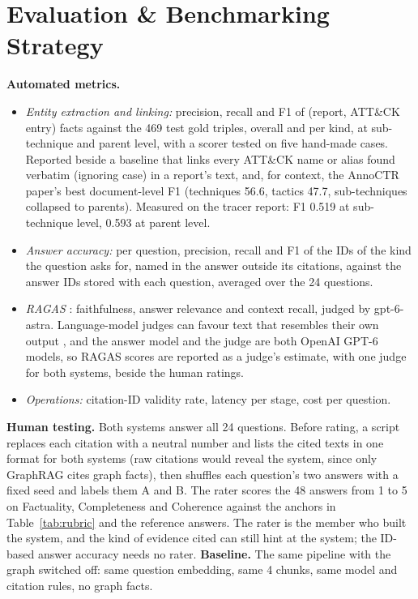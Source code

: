 \documentclass[10pt]{article}
\begin{document}
\section{Evaluation \& Benchmarking Strategy}\label{sec:eval}
\textbf{Automated metrics.}
\begin{itemize}
\item \emph{Entity extraction and linking:} precision, recall and F1 of (report, ATT\&CK entry) facts against the 469 test gold triples, overall and per kind, at sub-technique and parent level, with a scorer tested on five hand-made cases. Reported beside a baseline that links every ATT\&CK name or alias found verbatim (ignoring case) in a report's text, and, for context, the AnnoCTR paper's best document-level F1 (techniques 56.6, tactics 47.7, sub-techniques collapsed to parents). Measured on the tracer report: F1 0.519 at sub-technique level, 0.593 at parent level.
\item \emph{Answer accuracy:} per question, precision, recall and F1 of the IDs of the kind the question asks for, named in the answer outside its citations, against the answer IDs stored with each question, averaged over the 24 questions.
\item \emph{RAGAS} \cite{10}: faithfulness, answer relevance and context recall, judged by gpt-6-astra. Language-model judges can favour text that resembles their own output \cite{11,12,13}, and the answer model and the judge are both OpenAI GPT-6 models, so RAGAS scores are reported as a judge's estimate, with one judge for both systems, beside the human ratings.
\item \emph{Operations:} citation-ID validity rate, latency per stage, cost per question.
\end{itemize}
\textbf{Human testing.} Both systems answer all 24 questions. Before rating, a script replaces each citation with a neutral number and lists the cited texts in one format for both systems (raw citations would reveal the system, since only GraphRAG cites graph facts), then shuffles each question's two answers with a fixed seed and labels them A and B. The rater scores the 48 answers from 1 to 5 on Factuality, Completeness and Coherence against the anchors in Table~\ref{tab:rubric} and the reference answers. The rater is the member who built the system, and the kind of evidence cited can still hint at the system; the ID-based answer accuracy needs no rater.
\textbf{Baseline.} The same pipeline with the graph switched off: same question embedding, same 4 chunks, same model and citation rules, no graph facts.
\end{document}
